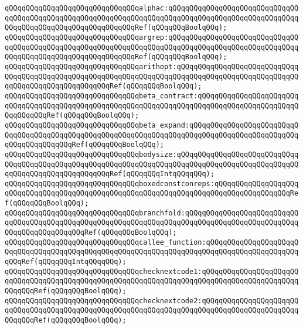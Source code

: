 \verb|qQQqqQQqqQQqqQQqqQQqqQQqqQQqqQQqalphac:qQQqqQQqqQQqqQQqqQQqqQQqqQQqqQQqqQQqqQQqqQQqqQQqqQQqqQQqqQQqqQQqqQQqqQQqqQQqqQQqqQQqqQQqqQQqqQQqqQQqqQQqqQQqqQQqqQQqqQQqqQQqqQQqqQQqRef(qQQqqQQqBoolqQQq);|\newline
\verb|qQQqqQQqqQQqqQQqqQQqqQQqqQQqqQQqargrep:qQQqqQQqqQQqqQQqqQQqqQQqqQQqqQQqqQQqqQQqqQQqqQQqqQQqqQQqqQQqqQQqqQQqqQQqqQQqqQQqqQQqqQQqqQQqqQQqqQQqqQQqqQQqqQQqqQQqqQQqqQQqqQQqqQQqRef(qQQqqQQqBoolqQQq);|\newline
\verb|qQQqqQQqqQQqqQQqqQQqqQQqqQQqqQQqarithopt:qQQqqQQqqQQqqQQqqQQqqQQqqQQqqQQqqQQqqQQqqQQqqQQqqQQqqQQqqQQqqQQqqQQqqQQqqQQqqQQqqQQqqQQqqQQqqQQqqQQqqQQqqQQqqQQqqQQqqQQqqQQqRef(qQQqqQQqBoolqQQq);|\newline
\verb|qQQqqQQqqQQqqQQqqQQqqQQqqQQqqQQqbeta_contract:qQQqqQQqqQQqqQQqqQQqqQQqqQQqqQQqqQQqqQQqqQQqqQQqqQQqqQQqqQQqqQQqqQQqqQQqqQQqqQQqqQQqqQQqqQQqqQQqqQQqqQQqRef(qQQqqQQqBoolqQQq);|\newline
\verb|qQQqqQQqqQQqqQQqqQQqqQQqqQQqqQQqbeta_expand:qQQqqQQqqQQqqQQqqQQqqQQqqQQqqQQqqQQqqQQqqQQqqQQqqQQqqQQqqQQqqQQqqQQqqQQqqQQqqQQqqQQqqQQqqQQqqQQqqQQqqQQqqQQqqQQqRef(qQQqqQQqBoolqQQq);|\newline
\newline
\verb|qQQqqQQqqQQqqQQqqQQqqQQqqQQqqQQqbodysize:qQQqqQQqqQQqqQQqqQQqqQQqqQQqqQQqqQQqqQQqqQQqqQQqqQQqqQQqqQQqqQQqqQQqqQQqqQQqqQQqqQQqqQQqqQQqqQQqqQQqqQQqqQQqqQQqqQQqqQQqqQQqRef(qQQqqQQqIntqQQqqQQq);|\newline
\newline
\verb|qQQqqQQqqQQqqQQqqQQqqQQqqQQqqQQqboxedconstconreps:qQQqqQQqqQQqqQQqqQQqqQQqqQQqqQQqqQQqqQQqqQQqqQQqqQQqqQQqqQQqqQQqqQQqqQQqqQQqqQQqqQQqqQQqRef(qQQqqQQqBoolqQQq);|\newline
\verb|qQQqqQQqqQQqqQQqqQQqqQQqqQQqqQQqbranchfold:qQQqqQQqqQQqqQQqqQQqqQQqqQQqqQQqqQQqqQQqqQQqqQQqqQQqqQQqqQQqqQQqqQQqqQQqqQQqqQQqqQQqqQQqqQQqqQQqqQQqqQQqqQQqqQQqqQQqRef(qQQqqQQqBoolqQQq);|\newline
\newline
\verb|qQQqqQQqqQQqqQQqqQQqqQQqqQQqqQQqcallee_function:qQQqqQQqqQQqqQQqqQQqqQQqqQQqqQQqqQQqqQQqqQQqqQQqqQQqqQQqqQQqqQQqqQQqqQQqqQQqqQQqqQQqqQQqqQQqqQQqRef(qQQqqQQqIntqQQqqQQq);|\newline
\newline
\verb|qQQqqQQqqQQqqQQqqQQqqQQqqQQqqQQqchecknextcode1:qQQqqQQqqQQqqQQqqQQqqQQqqQQqqQQqqQQqqQQqqQQqqQQqqQQqqQQqqQQqqQQqqQQqqQQqqQQqqQQqqQQqqQQqqQQqqQQqqQQqRef(qQQqqQQqBoolqQQq);|\newline
\verb|qQQqqQQqqQQqqQQqqQQqqQQqqQQqqQQqchecknextcode2:qQQqqQQqqQQqqQQqqQQqqQQqqQQqqQQqqQQqqQQqqQQqqQQqqQQqqQQqqQQqqQQqqQQqqQQqqQQqqQQqqQQqqQQqqQQqqQQqqQQqRef(qQQqqQQqBoolqQQq);|\newline
